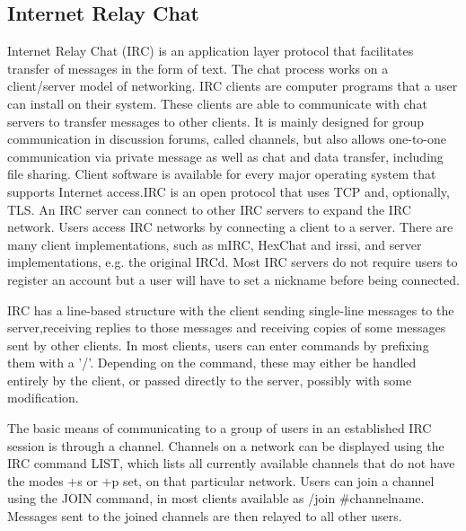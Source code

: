 
\subsection{Internet Relay Chat}
Internet Relay Chat (IRC) is an application layer protocol that facilitates transfer of messages in the form of text. The chat process works on a client/server model of networking. IRC clients are computer programs that a user can install on their system. These clients are able to communicate with chat servers to transfer messages to other clients. It is mainly designed for group communication in discussion forums, called channels, but also allows one-to-one communication via private message as well as chat and data transfer, including file sharing.
Client software is available for every major operating system that supports Internet access.IRC is an open protocol that uses TCP and, optionally, TLS. An IRC server can connect to other IRC servers to expand the IRC network. Users access IRC networks by connecting a client to a server. There are many client implementations, such as mIRC, HexChat and irssi, and server implementations, e.g. the original IRCd. Most IRC servers do not require users to register an account but a user will have to set a nickname before being connected.

IRC has a line-based structure with the client sending single-line messages to the server,receiving replies to those messages and receiving copies of some messages sent by other clients. In most clients, users can enter commands by prefixing them with a '/'. Depending on the command, these may either be handled entirely by the client, or  passed directly to the server, possibly with some modification.

The basic means of communicating to a group of users in an established IRC session is through a channel. Channels on a network can be displayed using the IRC command LIST, which lists all currently available channels that do not have the modes +s or +p set, on that particular network.
Users can join a channel using the JOIN command, in most clients available as /join \#channelname. Messages sent to the joined channels are then relayed to all other users.


